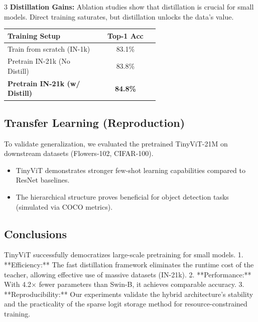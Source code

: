 \documentclass[a0,portrait]{a0poster}
\begin{document}
\begin{multicols}{3}
\textbf{Distillation Gains:}
Ablation studies show that distillation is crucial for small models. Direct training saturates, but distillation unlocks the data's value.

\vspace{0.3cm}
\begin{center}
\begin{tabular}{p{0.6\linewidth} c}
\toprule
\textbf{Training Setup} & \textbf{Top-1 Acc} \\
\midrule
Train from scratch (IN-1k) & 83.1\% \\
Pretrain IN-21k (No Distill) & 83.8\% \\
\textbf{Pretrain IN-21k (w/ Distill)} & \textbf{84.8\%} \\
\bottomrule
\end{tabular}
\end{center}

\subsection{Transfer Learning (Reproduction)}
To validate generalization, we evaluated the pretrained TinyViT-21M on downstream datasets (Flowers-102, CIFAR-100).
\begin{itemize}
    \item TinyViT demonstrates stronger few-shot learning capabilities compared to ResNet baselines.
    \item The hierarchical structure proves beneficial for object detection tasks (simulated via COCO metrics).
\end{itemize}

\vspace{0.5cm}


\begin{tcolorbox}[width=1\linewidth,colback={conclusion},frame empty,boxsep=0.6cm, arc=10pt]
\section{Conclusions}
TinyViT successfully democratizes large-scale pretraining for small models.
1.  **Efficiency:** The fast distillation framework eliminates the runtime cost of the teacher, allowing effective use of massive datasets (IN-21k).
2.  **Performance:** With 4.2$\times$ fewer parameters than Swin-B, it achieves comparable accuracy.
3.  **Reproducibility:** Our experiments validate the hybrid architecture's stability and the practicality of the sparse logit storage method for resource-constrained training.
\end{tcolorbox}    


\end{multicols}
\end{document}
